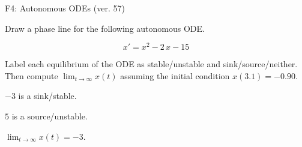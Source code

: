 \begin{exercise}
  \begin{exerciseTitle}F4: Autonomous ODEs (ver. 57)\end{exerciseTitle}
  \begin{exerciseStatement}
    

      Draw a phase line for the following 
      autonomous ODE.
    

    
\[x'= x^{2} - 2 \, x - 15\]

    

      Label each equilibrium of the ODE
      as stable/unstable and sink/source/neither.
      Then compute \(\lim_{t\to\infty}x(t)\)
      assuming the initial condition
      \(x( 3.1 )= -0.90\).
    

  \end{exerciseStatement}
  \begin{exerciseAnswer}
    

      \(-3\) is a sink/stable.
      
      \(5\) is a source/unstable.
    

    

      \(\lim_{t\to\infty}x(t)=-3\).
    

  \end{exerciseAnswer}
\end{exercise}